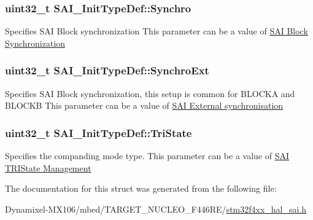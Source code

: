 \subsubsection[{\texorpdfstring{Synchro}{Synchro}}]{\setlength{\rightskip}{0pt plus 5cm}uint32\+\_\+t S\+A\+I\+\_\+\+Init\+Type\+Def\+::\+Synchro}\hypertarget{struct_s_a_i___init_type_def_aa664510b8555d0702834bc73565a818a}{}\label{struct_s_a_i___init_type_def_aa664510b8555d0702834bc73565a818a}
Specifies S\+AI Block synchronization This parameter can be a value of \hyperlink{group___s_a_i___block___synchronization}{S\+AI Block Synchronization} 
\subsubsection[{\texorpdfstring{Synchro\+Ext}{SynchroExt}}]{\setlength{\rightskip}{0pt plus 5cm}uint32\+\_\+t S\+A\+I\+\_\+\+Init\+Type\+Def\+::\+Synchro\+Ext}\hypertarget{struct_s_a_i___init_type_def_a70e3a9b25e1d5c969c7c14e678b34b08}{}\label{struct_s_a_i___init_type_def_a70e3a9b25e1d5c969c7c14e678b34b08}
Specifies S\+AI Block synchronization, this setup is common for B\+L\+O\+C\+KA and B\+L\+O\+C\+KB This parameter can be a value of \hyperlink{group___s_a_i___block___sync_ext}{S\+AI External synchronisation} 
\subsubsection[{\texorpdfstring{Tri\+State}{TriState}}]{\setlength{\rightskip}{0pt plus 5cm}uint32\+\_\+t S\+A\+I\+\_\+\+Init\+Type\+Def\+::\+Tri\+State}\hypertarget{struct_s_a_i___init_type_def_ab1a1d8d86c50495b69287a79f8217098}{}\label{struct_s_a_i___init_type_def_ab1a1d8d86c50495b69287a79f8217098}
Specifies the companding mode type. This parameter can be a value of \hyperlink{group___s_a_i___t_r_i_state___management}{S\+AI T\+R\+I\+State Management} 

The documentation for this struct was generated from the following file\+:\begin{DoxyCompactItemize}
\item 
Dynamixel-\/\+M\+X106/mbed/\+T\+A\+R\+G\+E\+T\+\_\+\+N\+U\+C\+L\+E\+O\+\_\+\+F446\+R\+E/\hyperlink{stm32f4xx__hal__sai_8h}{stm32f4xx\+\_\+hal\+\_\+sai.\+h}\end{DoxyCompactItemize}
